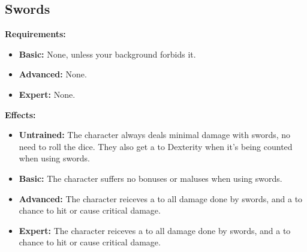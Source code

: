 \subsection{Swords}
\begin{table}[!ht]
\centering
{}
\end{table}
\textbf{Requirements:}
\begin{itemize}
	\item \textbf{Basic:} None, unless your background forbids it.
	\item \textbf{Advanced:} None.
	\item \textbf{Expert:} None.
\end{itemize}
\textbf{Effects:}
\begin{itemize}
	\item \textbf{Untrained:} The character always deals minimal damage with swords, no need to roll the dice. They also get a  to Dexterity when it's being counted when using swords.
	\item \textbf{Basic:} The character suffers no bonuses or maluses when using swords.
	\item \textbf{Advanced:} The character reiceves a  to all damage done by swords, and a  to chance to hit or cause critical damage.
	\item \textbf{Expert:} The character reiceves a  to all damage done by swords, and a  to chance to hit or cause critical damage.
\end{itemize}\newpage
